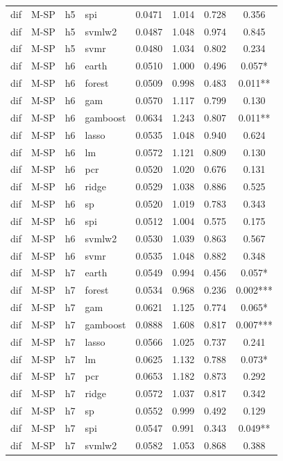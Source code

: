 \begin{ThreePartTable}
\begin{longtable}[t]{llclcccc}
dif & M-SP & h5 & spi & 0.0471 & 1.014 & 0.728 & 0.356\\
dif & M-SP & h5 & svmlw2 & 0.0487 & 1.048 & 0.974 & 0.845\\
dif & M-SP & h5 & svmr & 0.0480 & 1.034 & 0.802 & 0.234\\
\addlinespace
dif & M-SP & h6 & earth & 0.0510 & 1.000 & 0.496 & 0.057*\\
dif & M-SP & h6 & forest & 0.0509 & 0.998 & 0.483 & 0.011**\\
dif & M-SP & h6 & gam & 0.0570 & 1.117 & 0.799 & 0.130\\
dif & M-SP & h6 & gamboost & 0.0634 & 1.243 & 0.807 & 0.011**\\
dif & M-SP & h6 & lasso & 0.0535 & 1.048 & 0.940 & 0.624\\
dif & M-SP & h6 & lm & 0.0572 & 1.121 & 0.809 & 0.130\\
dif & M-SP & h6 & pcr & 0.0520 & 1.020 & 0.676 & 0.131\\
dif & M-SP & h6 & ridge & 0.0529 & 1.038 & 0.886 & 0.525\\
dif & M-SP & h6 & sp & 0.0520 & 1.019 & 0.783 & 0.343\\
dif & M-SP & h6 & spi & 0.0512 & 1.004 & 0.575 & 0.175\\
dif & M-SP & h6 & svmlw2 & 0.0530 & 1.039 & 0.863 & 0.567\\
dif & M-SP & h6 & svmr & 0.0535 & 1.048 & 0.882 & 0.348\\
\addlinespace
dif & M-SP & h7 & earth & 0.0549 & 0.994 & 0.456 & 0.057*\\
dif & M-SP & h7 & forest & 0.0534 & 0.968 & 0.236 & 0.002***\\
dif & M-SP & h7 & gam & 0.0621 & 1.125 & 0.774 & 0.065*\\
dif & M-SP & h7 & gamboost & 0.0888 & 1.608 & 0.817 & 0.007***\\
dif & M-SP & h7 & lasso & 0.0566 & 1.025 & 0.737 & 0.241\\
dif & M-SP & h7 & lm & 0.0625 & 1.132 & 0.788 & 0.073*\\
dif & M-SP & h7 & pcr & 0.0653 & 1.182 & 0.873 & 0.292\\
dif & M-SP & h7 & ridge & 0.0572 & 1.037 & 0.817 & 0.342\\
dif & M-SP & h7 & sp & 0.0552 & 0.999 & 0.492 & 0.129\\
dif & M-SP & h7 & spi & 0.0547 & 0.991 & 0.343 & 0.049**\\
dif & M-SP & h7 & svmlw2 & 0.0582 & 1.053 & 0.868 & 0.388\\

\end{longtable}
\end{ThreePartTable}
